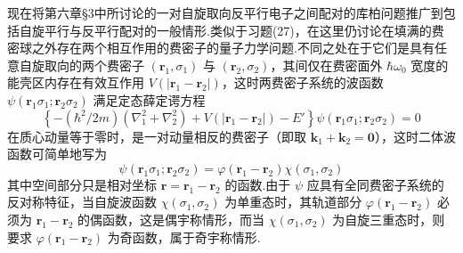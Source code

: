 现在将第六章§3中所讨论的一对自旋取向反平行电子之间配对的库柏问题推广到包括自旋平行与反平行配对的一般情形.类似于习题(27)，在这里仍讨论在填满的费密球之外存在两个相互作用的费密子的量子力学问题.不同之处在于它们是具有任意自旋取向的两个费密子 $\left(\boldsymbol{r}_{1},\sigma_{1}\right)$ 与 $\left(\boldsymbol{r}_{2},\sigma_{2}\right)$，其间仅在费密面外 $\hbar\omega_{0}$ 宽度的能壳区内存在有效互作用 $V\left(\left|\boldsymbol{r}_{1}-\boldsymbol{r}_{2}\right|\right)$，这时两费密子系统的波函数 $\psi\left(\boldsymbol{r}_{1}\sigma_{1};\boldsymbol{r}_{2}\sigma_{2}\right)$ 满足定态薛定谔方程
\begin{equation}
  \left\{-\left(\hbar^{2}/2m\right)\left(\nabla_{1}^{2}+\nabla_{2}^{2}\right)
  +V\left(\left|\boldsymbol{r}_{1}-\boldsymbol{r}_{2}\right|\right)-E'\right\}
  \psi\left(\boldsymbol{r}_{1}\sigma_{1};\boldsymbol{r}_{2}\sigma_{2}\right)=0
\end{equation}
在质心动量等于零时，是一对动量相反的费密子（即取 $\boldsymbol{k}_{1}+\boldsymbol{k}_{2}=\boldsymbol{0}$），这时二体波函数可简单地写为
\begin{equation}
  \psi\left(\boldsymbol{r}_{1}\sigma_{1};\boldsymbol{r}_{2}\sigma_{2}\right)
  =\varphi\left(\boldsymbol{r}_{1}-\boldsymbol{r}_{2}\right)\chi\left(\sigma_{1},\sigma_{2}\right)
\end{equation}
其中空间部分只是相对坐标 $\boldsymbol{r}=\boldsymbol{r}_{1}-\boldsymbol{r}_{2}$ 的函数.由于 $\psi$ 应具有全同费密子系统的反对称特征，当自旋波函数 $\chi\left(\sigma_{1},\sigma_{2}\right)$ 为单重态时，其轨道部分 $\varphi\left(\boldsymbol{r}_{1}-\boldsymbol{r}_{2}\right)$ 必须为 $\boldsymbol{r}_{1}-\boldsymbol{r}_{2}$ 的偶函数，这是偶宇称情形，而当 $\chi\left(\sigma_{1},\sigma_{2}\right)$ 为自旋三重态时，则要求 $\varphi\left(\boldsymbol{r}_{1}-\boldsymbol{r}_{2}\right)$ 为奇函数，属于奇宇称情形.


